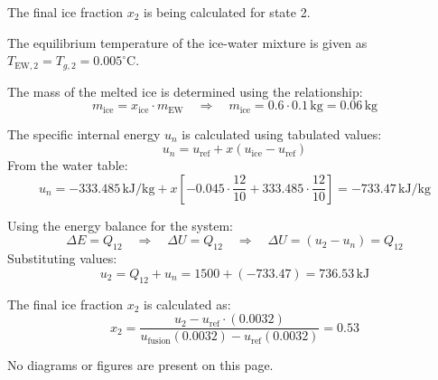The final ice fraction \( x_2 \) is being calculated for state 2.  

The equilibrium temperature of the ice-water mixture is given as \( T_{\text{EW},2} = T_{g,2} = 0.005^\circ\text{C} \).  

The mass of the melted ice is determined using the relationship:  
\[
m_{\text{ice}} = x_{\text{ice}} \cdot m_{\text{EW}} \quad \Rightarrow \quad m_{\text{ice}} = 0.6 \cdot 0.1 \, \text{kg} = 0.06 \, \text{kg}
\]  

The specific internal energy \( u_n \) is calculated using tabulated values:  
\[
u_n = u_{\text{ref}} + x \left( u_{\text{ice}} - u_{\text{ref}} \right)
\]  
From the water table:  
\[
u_n = -333.485 \, \text{kJ/kg} + x \left[ -0.045 \cdot \frac{12}{10} + 333.485 \cdot \frac{12}{10} \right] = -733.47 \, \text{kJ/kg}
\]  

Using the energy balance for the system:  
\[
\Delta E = Q_{12} \quad \Rightarrow \quad \Delta U = Q_{12} \quad \Rightarrow \quad \Delta U = (u_2 - u_n) = Q_{12}
\]  
Substituting values:  
\[
u_2 = Q_{12} + u_n = 1500 + (-733.47) = 736.53 \, \text{kJ}
\]  

The final ice fraction \( x_2 \) is calculated as:  
\[
x_2 = \frac{u_2 - u_{\text{ref}} \cdot (0.0032)}{u_{\text{fusion}} (0.0032) - u_{\text{ref}} (0.0032)} = 0.53
\]  

No diagrams or figures are present on this page.